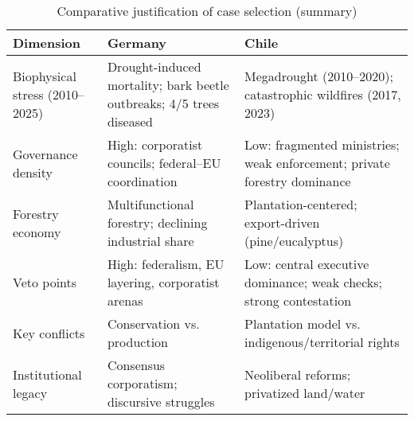 \begin{table}[h!]
\centering
\caption{Comparative justification of case selection (summary)}
\label{tab:comparative-matrix}
\begin{tabular}{@{}p{4cm}p{5cm}p{5cm}@{}}
\toprule
\textbf{Dimension} & \textbf{Germany} & \textbf{Chile} \\ \midrule
Biophysical stress (2010--2025) & Drought-induced mortality; bark beetle outbreaks; 4/5 trees diseased \parencite{BMEL2023} & Megadrought (2010--2020); catastrophic wildfires (2017, 2023) \\
Governance density & High: corporatist councils; federal--EU coordination & Low: fragmented ministries; weak enforcement; private forestry dominance \\
Forestry economy & Multifunctional forestry; declining industrial share & Plantation-centered; export-driven (pine/eucalyptus) \\
Veto points & High: federalism, EU layering, corporatist arenas & Low: central executive dominance; weak checks; strong contestation \\
Key conflicts & Conservation vs. production & Plantation model vs. indigenous/territorial rights \\
Institutional legacy & Consensus corporatism; discursive struggles \parencite{Winkel2011} & Neoliberal reforms; privatized land/water \parencite{Manuschevich2016} \\ \bottomrule
\end{tabular}
\end{table}